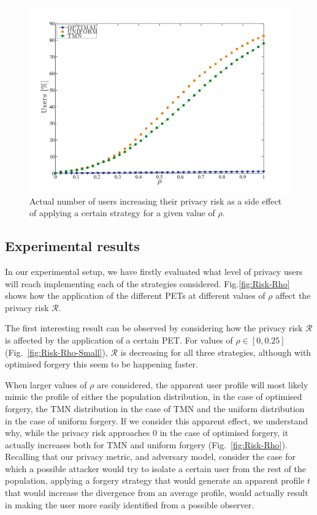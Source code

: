 \begin{figure}[htb]  
\includegraphics[width=\textwidth]{figures/Fig7.pdf}
\caption[Increased privacy risk.]{Actual number of users increasing their privacy risk as a side effect of applying a certain strategy for a given value of $\rho$.}
\label{fig:RhoIncr}
\end{figure}

\subsection{Experimental results}
In our experimental setup, we have firstly evaluated what level of privacy users will reach implementing each of the strategies considered. Fig.\ref{fig:Risk-Rho} shows how the application of the different PETs at different values of $\rho$ affect the privacy risk $\mathcal{R}$.

The first interesting result can be observed by considering how the privacy risk $\mathcal{R}$ is affected by the application of a certain PET. For values of $ \rho \in [0,0.25]$ (Fig.~\ref{fig:Risk-Rho-Small}), $\mathcal{R}$ is decreasing for all three strategies, although with optimised forgery this seem to be happening faster.

When larger values of $\rho$ are considered, the apparent user profile will most likely mimic the profile of either the population distribution, in the case of optimised forgery, the TMN distribution in the case of TMN and the uniform distribution in the case of uniform forgery.
If we consider this apparent effect, we understand why, while the privacy risk approaches 0 in the case of optimised forgery, it actually increases both for TMN and uniform forgery (Fig.~\ref{fig:Risk-Rho}). Recalling that our privacy metric, and adversary model, consider the case for which a possible attacker would try to isolate a certain user from the rest of the population, applying a forgery strategy that would generate an apparent profile $t$ that would increase the divergence from an average profile, would actually result in making the user more easily identified from a possible observer.

